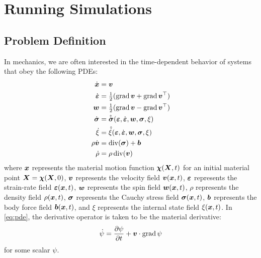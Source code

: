 \chapter{Running Simulations}

\section{Problem Definition}
In mechanics, we are often interested in the time-dependent behavior of systems that obey the following PDEs:
\begin{equation}\label{eq:pde}
\begin{aligned}
\dot{\boldsymbol{x}} &= \boldsymbol{v}
\\\dot{\boldsymbol{\varepsilon}} &= \tfrac{1}{2}(\operatorname{grad}{\boldsymbol{v}} + \operatorname{grad}{\boldsymbol{v}}^\top)
\\\boldsymbol{w} &= \tfrac{1}{2}(\operatorname{grad}{\boldsymbol{v}} - \operatorname{grad}{\boldsymbol{v}}^\top)
\\\dot{\boldsymbol{\sigma}} &= \hat{\dot{\boldsymbol{\sigma}}}(\boldsymbol{\varepsilon},\dot{\boldsymbol{\varepsilon}},\boldsymbol{w},\boldsymbol{\sigma},\xi)
\\\dot{\xi} &= \hat{\dot{\xi}}(\boldsymbol{\varepsilon},\dot{\boldsymbol{\varepsilon}},\boldsymbol{w},\boldsymbol{\sigma},\xi)
\\\rho \dot{\boldsymbol{v}} &= \operatorname{div}(\boldsymbol{\sigma}) + \boldsymbol{b}
\\\dot{\rho} &= \rho \operatorname{div}(\boldsymbol{v})
\end{aligned}
\end{equation}
where \(\boldsymbol{x}\) represents the material motion function \(\boldsymbol{\chi}(\boldsymbol{X},t)\) for an initial material point \(\boldsymbol{X} = \boldsymbol{\chi}(\boldsymbol{X},0)\), \(\boldsymbol{v}\) represents the velocity field \(\boldsymbol{v}(\boldsymbol{x},t)\), \(\boldsymbol{\varepsilon}\) represents the strain-rate field \(\boldsymbol{\varepsilon}(\boldsymbol{x},t)\), \(\boldsymbol{w}\) represents the spin field \(\boldsymbol{w}(\boldsymbol{x},t)\), \(\rho\) represents the density field \(\rho(\boldsymbol{x},t)\), \(\boldsymbol{\sigma}\) represents the Cauchy stress field \(\boldsymbol{\sigma}(\boldsymbol{x},t)\), \(\boldsymbol{b}\) represents the body force field \(\boldsymbol{b}(\boldsymbol{x},t)\), and \(\xi\) represents the internal state field \(\xi(\boldsymbol{x},t)\). In \eqref{eq:pde}, the derivative operator is taken to be the material derivative:
\[\dot{\psi} = \frac{\partial \psi}{\partial t} + \boldsymbol{v}\cdot\operatorname{grad}{\psi}\]
for some scalar \(\psi\).


